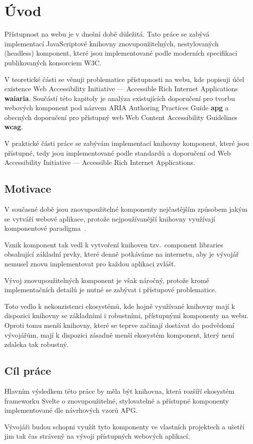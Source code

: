 \chapter{Úvod}

Přístupnost na webu je v dnešní době důležitá. Tato práce se zabývá implementací JavaScriptové knihovny
znovupoužitelných, nestylovaných (headless) komponent, které jsou implementované podle moderních specifikací publikovaných konsorciem W3C.

V teoretické části se věnuji problematice přístupnosti na webu, kde popisuji účel existence
Web Accessibility Initiative --- Accessible Rich Internet Applications \textbf{\gls{waiaria}}.
Součástí této kapitoly je analýza existujících doporučení pro tvorbu webových
komponent pod názvem ARIA Authoring Practices Guide \textbf{\gls{apg}} a
obecných doporučení pro přístupný web Web Content Accessibility Guidelines \textbf{\gls{wcag}}.

V praktické části práce se zabývám implementací knihovny komponent,
které jsou přístupné, tedy jsou implementované podle standardů a doporučení od Web Accessibility Initiative --- Accessible Rich Internet Applications.

\section{Motivace}

V současné době jsou znovupoužitelné komponenty nejčastějším způsobem jakým se vytváří webové aplikace, protože nejpoužívanější knihovny využívají komponentové paradigma~\cite{react,vue,solid,svelte}.

Vznik komponent tak vedl k vytvoření knihoven tzv.\ component libraries obsahující základní prvky, které denně potkáváme na internetu, aby je vývojář nemusel znovu implementovat pro každou aplikaci zvlášť.

Vývoj znovupoužitelných komponent je však náročný, protože kromě implementačních detailů je nutné se zabývat i přístupové problematice.

Toto vedlo k nekonzistenci ekosystémů, kde hojně využívané knihovny mají k dispozici knihovny se základními i robustními, přístupnými komponenty na webu. Oproti tomu menší knihovny, které se teprve začínají dostávat do podvědomí vývojářům, mají k dispozici zásadně menší ekosystém komponent, který není zdaleka tak robustný.

\section{Cíl práce}

Hlavním výsledkem této práce by měla být knihovna, která rozšíří ekosystém frameworku Svelte o znovupoužitelné, stylovatelné a přístupné komponenty implementované dle návrhových vzorů APG.

Vývojáři budou schopni využít tyto komponenty ve vlastních projektech a ušetří jim tak čas strávený na vývoji přístupných webových aplikací.
